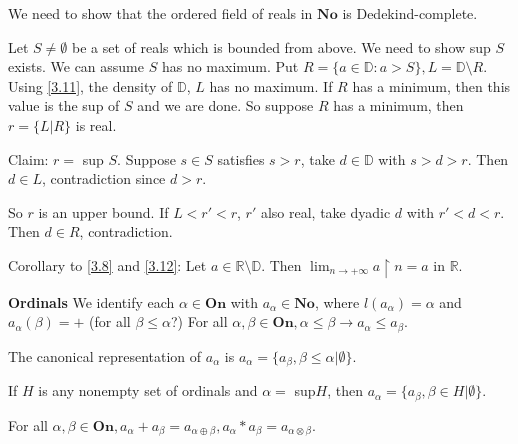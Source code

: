 
We need to show that the ordered field of reals in $\mathbf{No}$ is Dedekind-complete.

Let $S \neq \emptyset$ be a set of reals which is bounded from above. We need to show sup $S$ exists. We can assume $S$ has no maximum. Put $R=\{a \in \mathbb{D}: a>S\}, L=\mathbb{D} \setminus R$. Using \eqref{3.11}, the density of $\mathbb{D}$, $L$ has no maximum. If $R$ has a minimum, then this value is the sup of $S$ and we are done. So suppose $R$ has a minimum, then $r=\{L|R\}$ is real.

Claim: $r=$ sup $S$. Suppose $s \in S$ satisfies $s>r$, take $d \in \mathbb{D}$ with $s>d>r$. Then $d \in L$, contradiction since $d>r$.

So $r$ is an upper bound. If $L<r'<r$, $r'$ also real, take dyadic $d$ with $r'<d<r$. Then $d \in R$, contradiction.

\begin{corollary} %
Corollary to \eqref{3.8} and \eqref{3.12}: Let $a \in \mathbb{R} \setminus \mathbb{D}$. Then $\lim_{n \to +\infty} a \restriction n =a$ in $\mathbb{R}$.
 \end{corollary}

\textbf{Ordinals}
We identify each $\alpha \in \mathbf{On}$ with $a_\alpha \in \mathbf{No}$, where $l(a_\alpha)=\alpha$ and $a_{\alpha}(\beta)=+$ (for all $\beta \leq \alpha$?) For all $\alpha, \beta \in \mathbf{On}, \alpha \leq \beta \rightarrow a_\alpha \leq a_\beta$.

The canonical representation of $a_\alpha$ is $a_\alpha = \{a_{\beta}, \beta \leq \alpha | \emptyset \}$.

If $H$ is any nonempty set of ordinals and $\alpha =$ sup$ H$, then $a_\alpha = \{a_{\beta}, \beta \in H | \emptyset \}$.

\begin{proposition} %
For all $\alpha, \beta \in \mathbf{On}, a_\alpha + a_\beta = a_{\alpha \oplus \beta}, a_\alpha * a_\beta = a_{\alpha \otimes \beta}$.
 \end{proposition}


